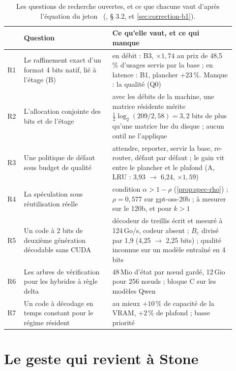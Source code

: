 \begin{table}[ht]
\centering\small
\caption[Les questions de recherche ouvertes]{Les questions de recherche ouvertes, et ce que chacune vaut d'après l'équation du jeton \calc~(, § 3.2, et \cref{sec:correction-b1}).}
\label{tab:recherche}
\begin{tabular}{@{}p{0.06\linewidth}p{0.36\linewidth}p{0.5\linewidth}@{}}
\toprule
& Question & Ce qu'elle vaut, et ce qui manque \\
\midrule
R1 & Le raffinement exact d'un format 4 bits natif, lié à l'étage (B) & en débit : B3, $\times 1{,}74$ au prix de 48,5\,\% d'usages servis par la base ; en latence : B1, plancher $+23\,\%$. Manque : la qualité (Q0) \\
R2 & L'allocation conjointe des bits et de l'étage & avec les débits de la machine, une matrice résidente mérite $\tfrac12 \log_2(209/2{,}58) = 3{,}2$ bits de plus qu'une matrice lue du disque ; aucun outil ne l'applique \\
R3 & Une politique de défaut sous budget de qualité & attendre, reporter, servir la base, re-router, défaut par défaut ; le gain vit entre le plancher et le plafond (A, LRU : 3,93 $\to$ 6,24, $\times 1{,}59$) \\
R4 & La spéculation sous réutilisation réelle & condition $\alpha > 1 - \rho$ (\cref{prop:spec-rho}) ; $\rho = 0{,}577$ sur gpt-oss-20b ; à mesurer sur le 120b, et pour $k > 1$ \\
R5 & Un code à 2 bits de deuxième génération décodable sans CUDA & décodeur de treillis écrit et mesuré à 124\,Go/s, codeur absent ; $B_e$ divisé par 1,9 (4,25 $\to$ 2,25 bits) ; qualité inconnue sur un modèle entraîné en 4 bits \\
R6 & Les arbres de vérification pour les hybrides à règle delta & 48\,Mio d'état par nœud gardé, 12\,Gio pour 256 nœuds ; bloque C sur les modèles Qwen \\
R7 & Un code à décodage en temps constant pour le régime résident & au mieux $+10\,\%$ de capacité de la VRAM, $+2\,\%$ de plafond ; basse priorité \\
\bottomrule
\end{tabular}
\end{table}

\section{Le geste qui revient à Stone}\label{sec:geste-stone}

